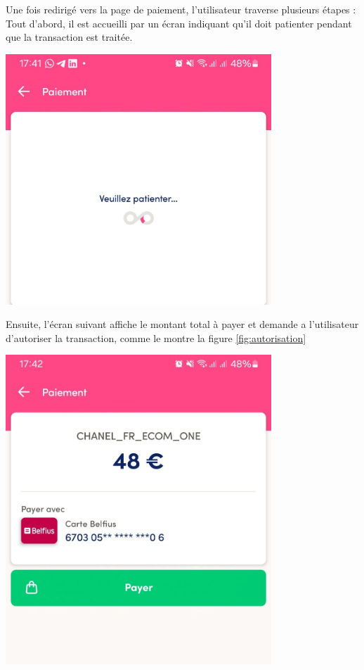 Une fois redirigé vers la page de paiement, l'utilisateur traverse plusieurs étapes :
Tout d'abord, il est accueilli par un écran indiquant qu'il doit patienter pendant que la transaction est traitée. 
\begin{center}
    \centering
    \includegraphics[width=10cm]{Figures/Screens/patience.jpeg}
    \label{fig:patience}
\end{center}
Ensuite, l'écran suivant affiche le montant total à payer et demande a l'utilisateur d'autoriser la transaction, comme le montre la figure \ref{fig:autorisation}
\begin{center}
    \centering
    \includegraphics[width=10cm]{Figures/Screens/montant.jpeg}
    \label{fig:autorisation}
\end{center}
